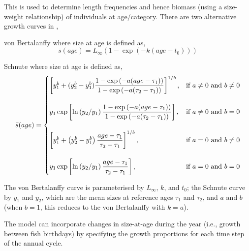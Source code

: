 This is used to determine length frequencies and hence biomass (using a size-weight relationship) of individuals at age/category. There are two alternative growth curves in \SPM, 

\begin{description}
\item{von Bertalanffy} where size at age is defined as,
\begin{equation} 
\bar{s}(age)= L_\infty \left( 1 - \exp \left( -k \left(age-t_0 \right) \right) \right)
\end{equation}

\item{Schnute} where size at age is defined as,
\begin{equation}
\bar{s}(age)=\displaystyle\begin{cases}
  \left[ y_1^b + (y_2^b - y_1^b) \dfrac{1-\exp \left(-a(age - \tau_1) \right)}{1-\exp \left(-a(\tau_2 - \tau_1) \right)} \right]^{1/b}, & \text{if $a\ne0$ and $b\ne0$} \\
  \AddVspace
  y_1 \exp \left[ \ln \left( y_2 / y_1 \right) \dfrac{1-\exp \left(-a(age - \tau_1) \right)}{1-\exp \left(-a(\tau_2 - \tau_1) \right)} \right], & \text{if $a\ne0$ and $b=0$} \\
  \AddVspace
  \left[ y_1^b + \left( y_2^b - y_1^b \right) \dfrac{age-\tau_1}{\tau_2 - \tau_1} \right]^{1/b}, & \text{if $a=0$ and $b\ne0$} \\
  \AddVspace
  y_1 \exp \left[ \ln \left( y_2/y_1 \right) \dfrac{age-\tau_1}{\tau_2 - \tau_1} \right] , & \text{if $a=0$ and $b=0$} \\
  \end{cases}
\end{equation}
\end{description}

The von Bertalanffy curve is parameterised by $L_\infty$, $k$, and $t_0$; the Schnute curve \citep{836} by $y_1$ and $y_2$, which are the mean sizes at reference ages $\tau_1$ and $\tau_2$, and $a$ and $b$ (when $b=1$, this reduces to the von Bertalanffy with $k=a$). 

The model can incorporate changes in size-at-age during the year (i.e., growth between fish birthdays) by specifying the growth proportions for each time step of the annual cycle.

\subsection{\label{sec:mean-weight}}

